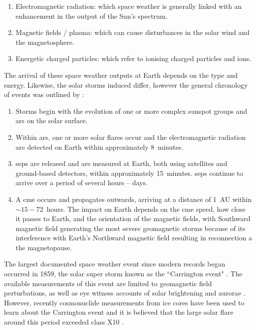 \begin{enumerate}
	\item{Electromagnetic radiation: which space weather is generally linked with an enhancement in the output of the Sun's spectrum.}
	
	\item{Magnetic fields / plasma: which can cause disturbances in the solar wind and the magnetosphere.}
	
	\item{Energetic charged particles: which refer to ionising charged particles and ions.}
\end{enumerate}

The arrival of these space weather outputs at Earth depends on the type and energy. Likewise, the solar storms induced differ, however the general chronology of events was outlined by \citet{cannon_extreme_2013}:

\begin{enumerate}
	\item{Storms begin with the evolution of one or more complex sunspot groups and \glspl{ar} on the solar surface.}
	
	\item{Within \glspl{ar}, one or more solar flares occur and the electromagnetic radiation are detected on Earth within approximately 8~minutes.}
	
	\item{\glspl{sep} are released and are measured at Earth, both using satellites and ground-based detectors, within approximately 15~minutes. \glspl{sep} continue to arrive over a period of several hours -- days.}
	
	\item{A \gls{cme} occurs and propagates outwards, arriving at a distance of 1~AU within $\sim15-72$~hours. The impact on Earth depends on the \gls{cme} speed, how close it passes to Earth, and the orientation of the magnetic fields, with Southward magnetic field generating the most severe geomagnetic storms because of its interference with Earth's Northward magnetic field resulting in reconnection a the magnetopause.}
	
\end{enumerate}

The largest documented space weather event since modern records began occurred in 1859, the solar super storm known as the ``Carrington event" \citep{carrington_description_1859}. The available measurements of this event are limited to geomagnetic field perturbations, as well as eye witness accounts of solar brightening and aurorae \citep{cannon_extreme_2013}. However, recently cosmonuclide measurements from ice cores have been used to learn about the Carrington event and it is believed that the large solar flare around this period exceeded class X10 \citep{riley_probability_2012}.

